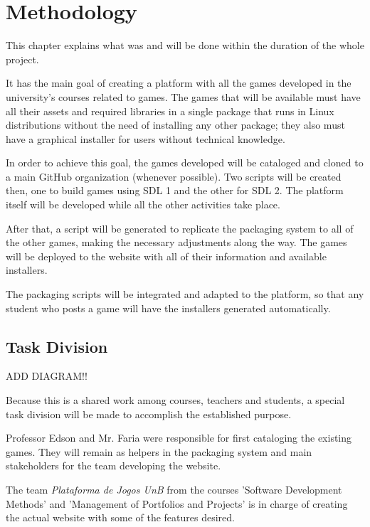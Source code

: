 \chapter[Methodology]{Methodology}
This chapter explains what was and will be done within the duration of the whole project.

It has the main goal of creating a platform with all the games developed in the university's courses related to games. The games that will be available must have all their assets and required libraries in a single package that runs in Linux distributions without the need of installing any other package; they also must have a graphical installer for users without technical knowledge.

In order to achieve this goal, the games developed will be cataloged and cloned to a main GitHub organization (whenever possible). Two scripts will be created then, one to build games using SDL 1 and the other for SDL 2. The platform itself will be developed while all the other activities take place.

After that, a script will be generated to replicate the packaging system to all of the other games, making the necessary adjustments along the way. The games will be deployed to the website with all of their information and available installers.

The packaging scripts will be integrated and adapted to the platform, so that any student who posts a game will have the installers generated automatically.

\section[Task Division]{Task Division}

ADD DIAGRAM!!

Because this is a shared work among courses, teachers and students, a special task division will be made to accomplish the established purpose.

Professor Edson and Mr. Faria were responsible for first cataloging the existing games. They will remain as helpers in the packaging system and main stakeholders for the team developing the website.

The team \textit{Plataforma de Jogos UnB} from the courses 'Software Development Methods' and 'Management of Portfolios and Projects' is in charge of creating the actual website with some of the features desired.

